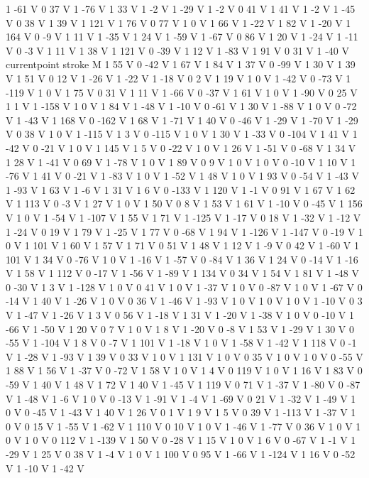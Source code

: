 {{1 -61 V
0 37 V
1 -76 V
1 33 V
1 -2 V
1 -29 V
1 -2 V
0 41 V
1 41 V
1 -2 V
1 -45 V
0 38 V
1 39 V
1 121 V
1 76 V
0 77 V
1 0 V
1 66 V
1 -22 V
1 82 V
1 -20 V
1 164 V
0 -9 V
1 11 V
1 -35 V
1 24 V
1 -59 V
1 -67 V
0 86 V
1 20 V
1 -24 V
1 -11 V
0 -3 V
1 11 V
1 38 V
1 121 V
0 -39 V
1 12 V
1 -83 V
1 91 V
0 31 V
1 -40 V
currentpoint stroke M
1 55 V
0 -42 V
1 67 V
1 84 V
1 37 V
0 -99 V
1 30 V
1 39 V
1 51 V
0 12 V
1 -26 V
1 -22 V
1 -18 V
0 2 V
1 19 V
1 0 V
1 -42 V
0 -73 V
1 -119 V
1 0 V
1 75 V
0 31 V
1 11 V
1 -66 V
0 -37 V
1 61 V
1 0 V
1 -90 V
0 25 V
1 1 V
1 -158 V
1 0 V
1 84 V
1 -48 V
1 -10 V
0 -61 V
1 30 V
1 -88 V
1 0 V
0 -72 V
1 -43 V
1 168 V
0 -162 V
1 68 V
1 -71 V
1 40 V
0 -46 V
1 -29 V
1 -70 V
1 -29 V
0 38 V
1 0 V
1 -115 V
1 3 V
0 -115 V
1 0 V
1 30 V
1 -33 V
0 -104 V
1 41 V
1 -42 V
0 -21 V
1 0 V
1 145 V
1 5 V
0 -22 V
1 0 V
1 26 V
1 -51 V
0 -68 V
1 34 V
1 28 V
1 -41 V
0 69 V
1 -78 V
1 0 V
1 89 V
0 9 V
1 0 V
1 0 V
0 -10 V
1 10 V
1 -76 V
1 41 V
0 -21 V
1 -83 V
1 0 V
1 -52 V
1 48 V
1 0 V
1 93 V
0 -54 V
1 -43 V
1 -93 V
1 63 V
1 -6 V
1 31 V
1 6 V
0 -133 V
1 120 V
1 -1 V
0 91 V
1 67 V
1 62 V
1 113 V
0 -3 V
1 27 V
1 0 V
1 50 V
0 8 V
1 53 V
1 61 V
1 -10 V
0 -45 V
1 156 V
1 0 V
1 -54 V
1 -107 V
1 55 V
1 71 V
1 -125 V
1 -17 V
0 18 V
1 -32 V
1 -12 V
1 -24 V
0 19 V
1 79 V
1 -25 V
1 77 V
0 -68 V
1 94 V
1 -126 V
1 -147 V
0 -19 V
1 0 V
1 101 V
1 60 V
1 57 V
1 71 V
0 51 V
1 48 V
1 12 V
1 -9 V
0 42 V
1 -60 V
1 101 V
1 34 V
0 -76 V
1 0 V
1 -16 V
1 -57 V
0 -84 V
1 36 V
1 24 V
0 -14 V
1 -16 V
1 58 V
1 112 V
0 -17 V
1 -56 V
1 -89 V
1 134 V
0 34 V
1 54 V
1 81 V
1 -48 V
0 -30 V
1 3 V
1 -128 V
1 0 V
0 41 V
1 0 V
1 -37 V
1 0 V
0 -87 V
1 0 V
1 -67 V
0 -14 V
1 40 V
1 -26 V
1 0 V
0 36 V
1 -46 V
1 -93 V
1 0 V
1 0 V
1 0 V
1 -10 V
0 3 V
1 -47 V
1 -26 V
1 3 V
0 56 V
1 -18 V
1 31 V
1 -20 V
1 -38 V
1 0 V
0 -10 V
1 -66 V
1 -50 V
1 20 V
0 7 V
1 0 V
1 8 V
1 -20 V
0 -8 V
1 53 V
1 -29 V
1 30 V
0 -55 V
1 -104 V
1 8 V
0 -7 V
1 101 V
1 -18 V
1 0 V
1 -58 V
1 -42 V
1 118 V
0 -1 V
1 -28 V
1 -93 V
1 39 V
0 33 V
1 0 V
1 131 V
1 0 V
0 35 V
1 0 V
1 0 V
0 -55 V
1 88 V
1 56 V
1 -37 V
0 -72 V
1 58 V
1 0 V
1 4 V
0 119 V
1 0 V
1 16 V
1 83 V
0 -59 V
1 40 V
1 48 V
1 72 V
1 40 V
1 -45 V
1 119 V
0 71 V
1 -37 V
1 -80 V
0 -87 V
1 -48 V
1 -6 V
1 0 V
0 -13 V
1 -91 V
1 -4 V
1 -69 V
0 21 V
1 -32 V
1 -49 V
1 0 V
0 -45 V
1 -43 V
1 40 V
1 26 V
0 1 V
1 9 V
1 5 V
0 39 V
1 -113 V
1 -37 V
1 0 V
0 15 V
1 -55 V
1 -62 V
1 110 V
0 10 V
1 0 V
1 -46 V
1 -77 V
0 36 V
1 0 V
1 0 V
1 0 V
0 112 V
1 -139 V
1 50 V
0 -28 V
1 15 V
1 0 V
1 6 V
0 -67 V
1 -1 V
1 -29 V
1 25 V
0 38 V
1 -4 V
1 0 V
1 100 V
0 95 V
1 -66 V
1 -124 V
1 16 V
0 -52 V
1 -10 V
1 -42 V
}}
